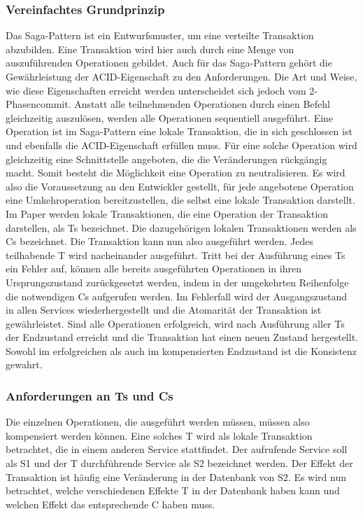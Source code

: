\subsubsection{Vereinfachtes Grundprinzip}
Das Saga-Pattern ist ein Entwurfsmuster, um eine verteilte Transaktion abzubilden. Eine Transaktion wird hier auch durch eine Menge von auszuführenden Operationen gebildet. Auch für das Saga-Pattern gehört die Gewährleistung der ACID-Eigenschaft zu den Anforderungen. Die Art und Weise, wie diese Eigenschaften erreicht werden unterscheidet sich jedoch vom 2-Phasencommit. 
Anstatt alle teilnehmenden Operationen durch einen Befehl gleichzeitig auszulösen, werden alle Operationen sequentiell ausgeführt. Eine Operation ist im Saga-Pattern eine lokale Transaktion, die in sich geschlossen ist und ebenfalls die ACID-Eigenschaft erfüllen muss. Für eine solche Operation wird gleichzeitig eine Schnittstelle angeboten, die die Veränderungen rückgängig macht. Somit besteht die Möglichkeit eine Operation zu neutralisieren. Es wird also die Voraussetzung an den Entwickler gestellt, für jede angebotene Operation eine Umkehroperation bereitzustellen, die selbst eine lokale Transaktion darstellt. 
Im Paper werden lokale Transaktionen, die eine Operation der Transaktion darstellen, als Ts bezeichnet. Die dazugehörigen lokalen Transaktionen werden als Cs bezeichnet. 
Die Transaktion kann nun also ausgeführt werden. Jedes teilhabende T wird nacheinander ausgeführt. Tritt bei der Ausführung eines Ts ein Fehler auf, können alle bereits ausgeführten Operationen in ihren Ursprungszustand zurückgesetzt werden, indem in der umgekehrten Reihenfolge die notwendigen Cs aufgerufen werden. Im Fehlerfall wird der Ausgangszustand in allen Services wiederhergestellt und die Atomarität der Transaktion ist gewährleistet. Sind alle Operationen erfolgreich, wird nach Ausführung aller Ts der Endzustand erreicht und die Transaktion hat einen neuen Zustand hergestellt. Sowohl im erfolgreichen als auch im kompensierten Endzustand ist die Konsistenz gewahrt.

\subsubsection{Anforderungen an Ts und Cs}
Die einzelnen Operationen, die ausgeführt werden müssen, müssen also kompensiert werden können. Eine solches T wird als lokale Transaktion betrachtet, die in einem anderen Service stattfindet. Der aufrufende Service soll als S1 und der T durchführende Service als S2 bezeichnet werden. Der Effekt der Transaktion ist häufig eine Veränderung in der Datenbank von S2. Es wird nun betrachtet, welche verschiedenen Effekte T in der Datenbank haben kann und welchen Effekt das entsprechende C haben muss.

